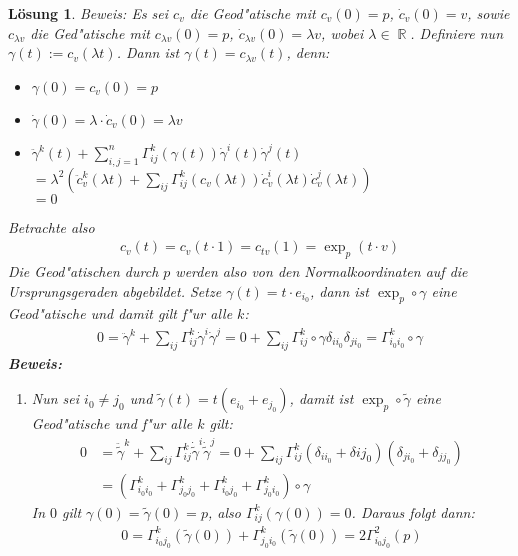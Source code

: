 \documentclass[paper=A4, twoside, chapterprefix=true, bibliography=totoc, headsepline]{scrbook}
\DeclareMathOperator{\R}{\mathbb{R}}
\theoremstyle{plain}
\theoremstyle{nonumberplain}
\theoremstyle{empty}
\theoremstyle{break}
\newtheorem{Loes}{L\"osung}
\begin{document}
\begin{Loes}
\emph{Beweis:} Es sei $c_v$ die Geod"atische mit $c_v(0) = p$, $\dot c_v(0) = v$, sowie $c_{\lambda v}$ die Ged"atische mit $c_{\lambda v}(0) = p$, $\dot c_{\lambda v}(0) = \lambda v$, wobei $\lambda \in \R$.
Definiere nun $\gamma(t) := c_v(\lambda t)$. Dann ist $\gamma(t) = c_{\lambda v}(t)$, denn:\begin{itemize}
\item
	$\gamma(0) = c_v(0) = p$
\item
	$\dot \gamma(0) = \lambda \cdot \dot c_v(0) = \lambda v$
\item
	$\ddot \gamma^k(t) + \sum_{i,j=1}^n \Gamma_{ij}^k(\gamma(t)) \dot\gamma^{i}(t) \dot\gamma^{j}(t)$\\
	$= \lambda^2 \left( \ddot c_v^k(\lambda t) + \sum_{ij} \Gamma_{ij}^k(c_v(\lambda t)) \dot c_v^{i}(\lambda t) \dot c_v^{j}(\lambda t) \right)$\\
	$=0$
\end{itemize}
Betrachte also
\begin{align*}
	c_v(t) = c_v(t \cdot 1) = c_{tv}(1) = \exp_p(t \cdot v)
\end{align*}
Die Geod"atischen durch $p$ werden also von den Normalkoordinaten auf die Ursprungsgeraden abgebildet. Setze $\gamma(t) = t \cdot e_{i_0}$, dann ist $\exp_p \circ \gamma$ eine Geod"atische und damit gilt f"ur alle $k$:
\begin{align*}
	0 = \ddot\gamma^k + \sum_{ij} \Gamma_{ij}^k \dot\gamma^{i} \dot\gamma^{j} = 0 + \sum_{ij} \Gamma_{ij}^k \circ \gamma \delta_{ii_0} \delta_{ji_0} = \Gamma_{i_0i_0}^k \circ \gamma
\end{align*}
\textbf{Beweis:}\begin{enumerate}[label=(\roman*),leftmargin=*,widest=iii]
\item[(iii)]
	Nun sei $i_0 \ne j_0$ und $\tilde\gamma(t) = t(e_{i_0} + e_{j_0})$, damit ist $\exp_p \circ \tilde\gamma$ eine Geod"atische und f"ur alle $k$ gilt:
	\begin{align*}
		0 &= \ddot{\tilde\gamma}^k + \sum_{ij} \Gamma_{ij}^k \dot{\tilde\gamma}^{i} \dot{\tilde\gamma}^{j} = 0 + \sum_{ij} \Gamma_{ij}^k (\delta_{ii_0} + \delta{ij_0}) (\delta_{ji_0} + \delta_{jj_0})\\
		&= \left( \Gamma_{i_0i_0}^k + \Gamma_{j_0j_0}^k + \Gamma_{i_0j_0}^k +\Gamma_{j_0i_0}^k \right) \circ \gamma
	\end{align*}
	In $0$ gilt $\gamma(0) = \tilde\gamma(0) = p$, also $\Gamma_{ij}^k(\gamma(0)) = 0$. Daraus folgt dann:
	\begin{align*}
		0 = \Gamma_{i_0j_0}^k (\tilde\gamma(0)) + \Gamma_{j_0i_0}^k (\tilde\gamma(0)) = 2 \Gamma_{i_0j_0}^2(p)

\end{align*}
\end{enumerate}
\end{Loes}
\end{document}

